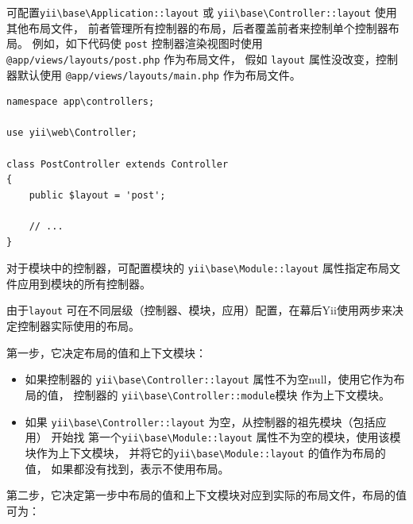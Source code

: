 可配置\texttt{yii{\allowbreak{}\textbackslash}base{\allowbreak{}\textbackslash}Application\allowbreak{}::\allowbreak{}layout} 或 \texttt{yii{\allowbreak{}\textbackslash}base{\allowbreak{}\textbackslash}Controller\allowbreak{}::\allowbreak{}layout} 使用其他布局文件，
前者管理所有控制器的布局，后者覆盖前者来控制单个控制器布局。
例如，如下代码使 \lstinline|post| 控制器渲染视图时使用 \lstinline|@app/views/layouts/post.php| 作为布局文件，
假如 \lstinline|layout| 属性没改变，控制器默认使用 \lstinline|@app/views/layouts/main.php| 作为布局文件。

\lstset{language=php}\begin{lstlisting}
namespace app\controllers;

use yii\web\Controller;

class PostController extends Controller
{
    public $layout = 'post';
    
    // ...
}
\end{lstlisting}
对于模块中的控制器，可配置模块的 \texttt{yii{\allowbreak{}\textbackslash}base{\allowbreak{}\textbackslash}Module\allowbreak{}::\allowbreak{}layout} 属性指定布局文件应用到模块的所有控制器。

由于\lstinline|layout| 可在不同层级（控制器、模块，应用）配置，在幕后Yii使用两步来决定控制器实际使用的布局。

第一步，它决定布局的值和上下文模块：

\begin{itemize}
\item 如果控制器的 \texttt{yii{\allowbreak{}\textbackslash}base{\allowbreak{}\textbackslash}Controller\allowbreak{}::\allowbreak{}layout} 属性不为空null，使用它作为布局的值，
控制器的 \texttt{yii{\allowbreak{}\textbackslash}base{\allowbreak{}\textbackslash}Controller\allowbreak{}::\allowbreak{}module}模块 作为上下文模块。
\item 如果 \texttt{yii{\allowbreak{}\textbackslash}base{\allowbreak{}\textbackslash}Controller\allowbreak{}::\allowbreak{}layout} 为空，从控制器的祖先模块（包括应用） 开始找
第一个\texttt{yii{\allowbreak{}\textbackslash}base{\allowbreak{}\textbackslash}Module\allowbreak{}::\allowbreak{}layout} 属性不为空的模块，使用该模块作为上下文模块，
并将它的\texttt{yii{\allowbreak{}\textbackslash}base{\allowbreak{}\textbackslash}Module\allowbreak{}::\allowbreak{}layout} 的值作为布局的值，
如果都没有找到，表示不使用布局。
\end{itemize}
第二步，它决定第一步中布局的值和上下文模块对应到实际的布局文件，布局的值可为：

